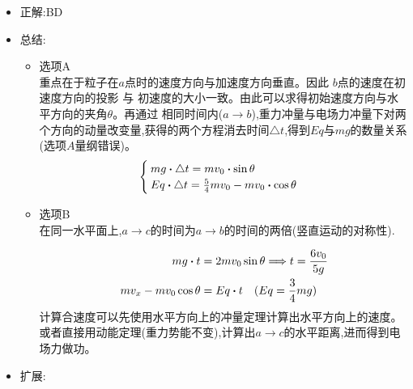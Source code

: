 \documentclass{article}
\begin{document}
    \begin{itemize}
        \item 正解:\quad BD
        \item 总结:\quad 
            \begin{itemize}
                \item 选项A \\
                        重点在于粒子在$a$点时的速度方向与加速度方向垂直。因此 \quad $b$点的速度在初速度方向的投影 \quad 与 \quad 初速度的大小一致。由此可以求得初始速度方向与水平方向的夹角$\theta$。再通过
                        相同时间内($a \rightarrow b$),重力冲量与电场力冲量下对两个方向的动量改变量,获得的两个方程消去时间$\triangle t$,得到$Eq$与$mg$的数量关系(选项$A$量纲错误)。
                        $$
                        \begin{cases}
                            mg \vdot \triangle t = m v_{0} \vdot \sin{\theta}           \\
                            Eq \vdot \triangle t = \frac{5}{4} m v_{0} - m v_{0} \vdot \cos{\theta}
                        \end{cases}
                        $$

                \item 选项B \\
                      在同一水平面上,$a \rightarrow c$的时间为$a \rightarrow b$的时间的两倍(竖直运动的对称性).
                      
                      \begin{align*}
                        mg \vdot t &= 2 m v_{0} \sin{\theta} \lra t = \frac{6 v_{0}}{5 g}    \\
                        m v_{x} - m v_{0} \cos{\theta} &= Eq \vdot t \quad (Eq = \frac{3}{4} mg)
                      \end{align*}
                      计算合速度可以先使用水平方向上的冲量定理计算出水平方向上的速度。或者直接用动能定理(重力势能不变),计算出$a \rightarrow c$的水平距离,进而得到电场力做功。
            \end{itemize}        
        \item 扩展:\quad
    \end{itemize}
\end{document}
